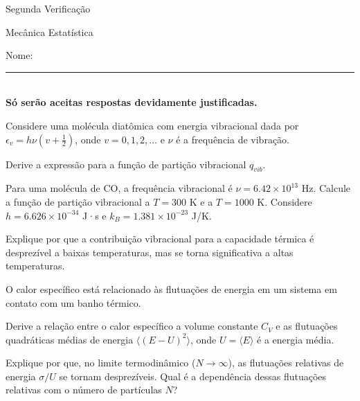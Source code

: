 \documentclass[fleqn,a4paper]{exam}
\theoremstyle{break} \newtheorem{exemplo}{Exemplo}
\theoremstyle{break} \newtheorem{exercicio}{Exercício}
\begin{document}
\begin{center}
{\large Segunda Verificação}

{\large Mecânica Estatística}
\end{center}
\vspace{0.5cm} Nome:\rule{14cm}{0.01cm} \\

\vspace{1 cm}
{\bf Só serão aceitas respostas devidamente justificadas.}
\vspace{1 cm}

\begin{questions}

\question[3.0] Considere uma molécula diatômica com energia vibracional dada por $\epsilon_v = h\nu(v+\frac{1}{2})$, onde $v = 0, 1, 2, \ldots$ e $\nu$ é a frequência de vibração.
\begin{parts}
  \item Derive a expressão para a função de partição vibracional $q_{vib}$.
  \item Para uma molécula de CO, a frequência vibracional é $\nu = 6.42 \times 10^{13}$ Hz. Calcule a função de partição vibracional a $T = 300$ K e a $T = 1000$ K. Considere $h = 6.626 \times 10^{-34}$ J·s e $k_B = 1.381 \times 10^{-23}$ J/K.
  \item Explique por que a contribuição vibracional para a capacidade térmica é desprezível a baixas temperaturas, mas se torna significativa a altas temperaturas.
\end{parts}

\question[3.0] O calor específico está relacionado às flutuações de energia em um sistema em contato com um banho térmico.
\begin{parts}
  \item Derive a relação entre o calor específico a volume constante $C_V$ e as flutuações quadráticas médias de energia $\langle(E-U)^2\rangle$, onde $U = \langle E \rangle$ é a energia média.
  \item Explique por que, no limite termodinâmico ($N \to \infty$), as flutuações relativas de energia $\sigma/U$ se tornam desprezíveis. Qual é a dependência dessas flutuações relativas com o número de partículas $N$?
\end{parts}


\end{questions}
\end{document}
